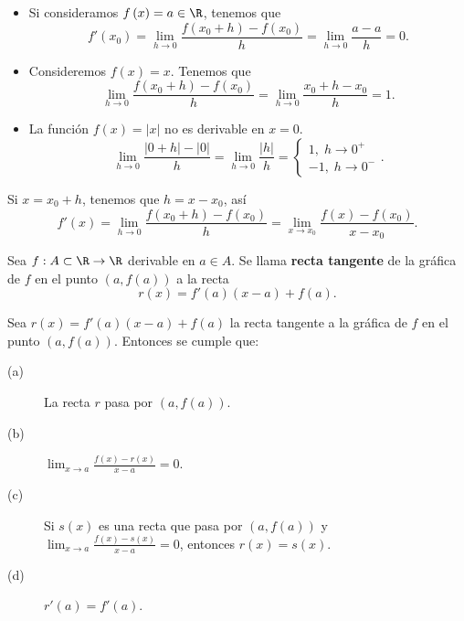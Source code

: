 \begin{eg}
\normalfont 
\begin{itemize}
\item Si consideramos $\displaystyle f\left(x\right) = a \in \R $, tenemos que 
	\[f'\left(x_{0}\right) = \lim_{h \to 0}\frac{f\left(x_{0}+h\right)-f\left(x_{0}\right)}{h} = \lim_{h \to 0}\frac{a - a}{h} = 0 .\]
\item Consideremos $\displaystyle f\left(x\right) = x $. Tenemos que
	\[\lim_{h \to 0}\frac{f\left(x_{0}+h\right)-f\left(x_{0}\right)}{h} = \lim_{h \to 0}\frac{x_{0}+h-x_{0}}{h} = 1 .\]
\item La función $\displaystyle f\left(x\right) = \left|x\right| $ no es derivable en $\displaystyle x = 0 $.
	\[ \lim_{h \to 0}\frac{ \left|0 + h\right|- \left|0\right|}{h} = \lim_{h \to 0}\frac{ \left|h\right|}{h} = 
	\begin{cases}
	1, \; h \to 0 ^{+} \\
	-1, \; h \to 0^{-}
	\end{cases}
	.\]
\end{itemize}
\end{eg}
\begin{observation}
\normalfont Si $\displaystyle x = x_{0} +h $, tenemos que $\displaystyle h = x - x_{0} $, así
\[f'\left(x\right) = \lim_{h \to 0}\frac{f\left(x_{0}+h\right)-f\left(x_{0}\right)}{h} = \lim_{x \to x_{0}}\frac{f\left(x\right)-f\left(x_{0}\right)}{x - x_{0}} .\]
\end{observation}
\begin{fdefinition}
\normalfont Sea $\displaystyle f : A \subset \R \to \R $ derivable en $\displaystyle a \in A $. Se llama \textbf{recta tangente} de la gráfica de $\displaystyle f $ en el punto $\displaystyle \left(a,f\left(a\right)\right) $ a la recta
\[r\left(x\right) = f'\left(a\right)\left(x-a\right) + f\left(a\right) .\]
\end{fdefinition}
\begin{ftheorem}[]
\normalfont Sea $\displaystyle r\left(x\right) = f'\left(a\right)\left(x-a\right) + f\left(a\right) $ la recta tangente a la gráfica de $\displaystyle f $ en el punto $\displaystyle \left(a,f\left(a\right)\right) $. Entonces se cumple que:
\begin{description}
\item[(a)] La recta $\displaystyle r $ pasa por $\displaystyle \left(a, f\left(a\right)\right) $.
\item[(b)] $\displaystyle \lim_{x \to a} \frac{f\left(x\right)-r\left(x\right)}{x - a} = 0 $.
\item[(c)] Si $\displaystyle s\left(x\right) $ es una recta que pasa por $\displaystyle \left(a, f\left(a\right)\right) $ y $\displaystyle \lim_{x \to a}\frac{f\left(x\right)-s\left(x\right)}{x-a} = 0 $, entonces $\displaystyle r\left(x\right) = s\left(x\right) $.
\item[(d)] $\displaystyle r'\left(a\right) = f'\left(a\right) $.
\end{description}
\end{ftheorem}
